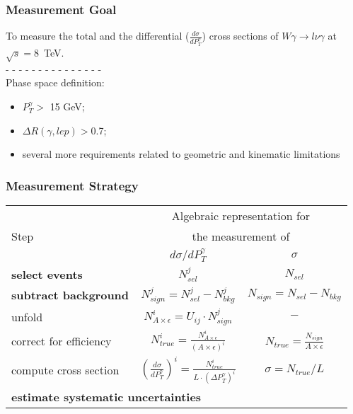 \begin{frame}\frametitle{Measurement Goal}
  \scriptsize

  To measure the total and the differential ($\frac{d\sigma}{dP_T^{\gamma}}$) cross sections of $W\gamma\rightarrow l\nu\gamma$ at $\sqrt{s}=$8~TeV.\\
  - - - - - - - - - - - - - - - \\
  Phase space definition:
  \begin{itemize}
    \item $P_T^{\gamma}>$ 15 GeV;
    \item $\Delta{R}(\gamma,lep) > $0.7;
    \item several more requirements related to geometric and kinematic limitations
  \end{itemize}
\end{frame}%

\begin{frame}\frametitle{Measurement Strategy}
\begin{table}[h]
  \scriptsize
  \begin{center}
  \begin{tabular}{|l|c|c|}
    \hline
          & \multicolumn{2}{|c|}{Algebraic representation for} \\ 
     Step & \multicolumn{2}{|c|}{the measurement of} \\ 
          & $d\sigma/dP_{T}^{\gamma}$ & $\sigma$ \\ \hline
    {\bfseries\footnotesize{select events}} & {\bfseries{$N_{sel}^j$}} &    {\bfseries{$N_{sel}$}}       \\ \hline
    {\bfseries\footnotesize{subtract background}} & {\bfseries{$N_{sign}^j = N_{sel}^j - N_{bkg}^j$}} &    {\bfseries{$N_{sign}=N_{sel}-N_{bkg}$}}       \\ \hline
    unfold   & $N_{A\times\epsilon}^i = U_{ij} \cdot N_{sign}^j$ &    $-$       \\ \hline
    correct for efficiency & $N_{true}^i = \frac{N_{A\times\epsilon}^i}{(A \times\epsilon)^i}$ &  $N_{true}=\frac{N_{sign}}{A\times\epsilon}$       \\ \hline
    compute cross section & $ \left( \frac{d\sigma}{dP_{T}^\gamma} \right) ^i = \frac{N_{true}^i}{L \cdot (\Delta P_T^\gamma)^i}$  &  $\sigma = N_{true}/L$       \\ \hline
    \multicolumn{3}{|l|}{\bfseries\footnotesize{estimate systematic uncertainties}}          \\ \hline
  \end{tabular}
  \label{tab:analysisOutline}
  \end{center}
\end{table}
\end{frame}%
